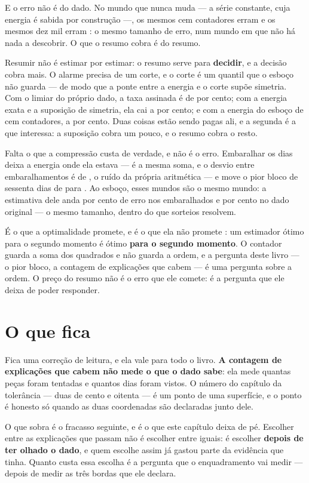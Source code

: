 E o erro não é do dado. No mundo que nunca muda --- a série constante, cuja energia é sabida por
construção ---, os mesmos cem contadores erram \numBitsConstanteCem{} e os mesmos dez mil erram
\numBitsConstanteDezMil: o mesmo tamanho de erro, num mundo em que não há nada a descobrir. O que o
resumo cobra é do resumo.

Resumir não é estimar por estimar: o resumo serve para \textbf{decidir}, e a decisão cobra mais. O
alarme precisa de um corte, e o corte é um quantil que o esboço não guarda --- de modo que a ponte
entre a energia e o corte supõe simetria. Com o limiar do próprio dado, a taxa assinada é de
\numBitsTaxaLimiar{} por cento; com a energia exata e a suposição de simetria, ela cai a \numBitsTaxaGaussiana{} por cento;
e com a energia do esboço de cem contadores, a \numBitsTaxaEsboco{} por cento. Duas coisas estão sendo pagas
ali, e a segunda é a que interessa: a suposição cobra um pouco, e o resumo cobra o resto.

Falta o que a compressão custa de verdade, e não é o erro. Embaralhar os dias deixa a energia onde
ela estava --- é a mesma soma, e o desvio entre \numBitsPermutacoes{} embaralhamentos é de
\numBitsDesvioEnergia{}, o ruído da própria aritmética --- e move o pior bloco de sessenta dias de
\numBitsPiorMenor{} para \numBitsPiorMaior{}. Ao esboço, esses mundos são o mesmo mundo: a estimativa
dele anda \numBitsErroEmbaralhado{} por cento de erro nos embaralhados e \numBitsErroCem{} por cento
no dado original ---
o mesmo tamanho, dentro do que \numBitsMundos{} sorteios resolvem.

É o que a optimalidade promete, e é o que ela não promete \cite{zamir2025optimality}: um estimador
ótimo para o segundo momento é ótimo \textbf{para o segundo momento}. O contador guarda a soma dos
quadrados e não guarda a ordem, e a pergunta deste livro --- o pior bloco, a contagem de explicações
que cabem --- é uma pergunta sobre a ordem. O preço do resumo não é o erro que ele comete: é a
pergunta que ele deixa de poder responder.

\section{O que fica}

Fica uma correção de leitura, e ela vale para todo o livro. \textbf{A contagem de explicações que
cabem não mede o que o dado sabe}: ela mede quantas peças foram tentadas e quantos dias foram
vistos. O número do capítulo da tolerância --- duas de cento e oitenta --- é um ponto de uma
superfície, e o ponto é honesto só quando as duas coordenadas são declaradas junto dele.

O que sobra é o fracasso seguinte, e é o que este capítulo deixa de pé. Escolher entre as
explicações que passam não é escolher entre iguais: é escolher \textbf{depois de ter olhado o dado}, e
quem escolhe assim já gastou parte da evidência que tinha. Quanto custa essa escolha é a pergunta
que o enquadramento vai medir --- depois de medir as três bordas que ele declara.
